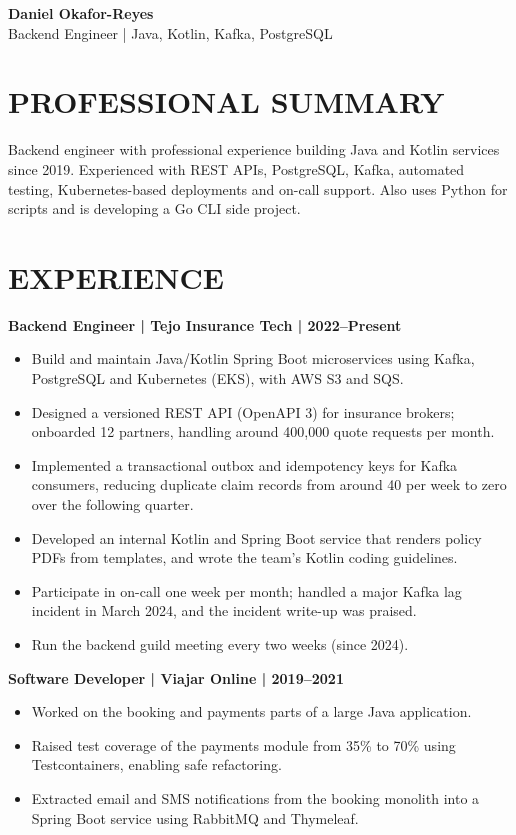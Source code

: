 \documentclass[11pt,a4paper]{article}
\begin{document}
\begin{center}
{\Huge\bfseries\color{primarycolor} Daniel Okafor-Reyes}\\[0.35em]
{\large\color{accentcolor} Backend Engineer | Java, Kotlin, Kafka, PostgreSQL}
\end{center}

\section*{PROFESSIONAL SUMMARY}
Backend engineer with professional experience building Java and Kotlin services since 2019. Experienced with REST APIs, PostgreSQL, Kafka, automated testing, Kubernetes-based deployments and on-call support. Also uses Python for scripts and is developing a Go CLI side project.

\section*{EXPERIENCE}
\textbf{Backend Engineer | Tejo Insurance Tech | 2022–Present}
\begin{itemize}
\item Build and maintain Java/Kotlin Spring Boot microservices using Kafka, PostgreSQL and Kubernetes (EKS), with AWS S3 and SQS.
\item Designed a versioned REST API (OpenAPI 3) for insurance brokers; onboarded 12 partners, handling around 400,000 quote requests per month.
\item Implemented a transactional outbox and idempotency keys for Kafka consumers, reducing duplicate claim records from around 40 per week to zero over the following quarter.
\item Developed an internal Kotlin and Spring Boot service that renders policy PDFs from templates, and wrote the team's Kotlin coding guidelines.
\item Participate in on-call one week per month; handled a major Kafka lag incident in March 2024, and the incident write-up was praised.
\item Run the backend guild meeting every two weeks (since 2024).
\end{itemize}

\textbf{Software Developer | Viajar Online | 2019–2021}
\begin{itemize}
\item Worked on the booking and payments parts of a large Java application.
\item Raised test coverage of the payments module from 35\% to 70\% using Testcontainers, enabling safe refactoring.
\item Extracted email and SMS notifications from the booking monolith into a Spring Boot service using RabbitMQ and Thymeleaf.
\end{itemize}
\end{document}
